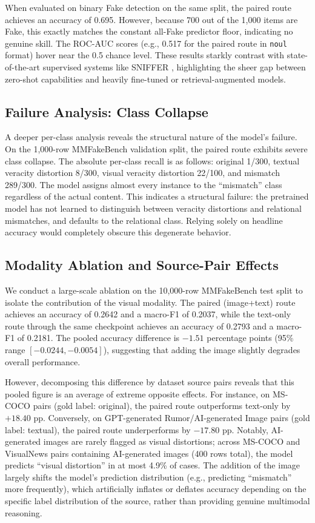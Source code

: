\documentclass{article} %
\begin{document}
When evaluated on binary Fake detection on the same split, the paired route achieves an accuracy of 0.695. However, because 700 out of the 1,000 items are Fake, this exactly matches the constant all-Fake predictor floor, indicating no genuine skill. The ROC-AUC scores (e.g., 0.517 for the paired route in \texttt{noul} format) hover near the 0.5 chance level. These results starkly contrast with state-of-the-art supervised systems like SNIFFER \citep{Qi2024SnifferMultimodal}, highlighting the sheer gap between zero-shot capabilities and heavily fine-tuned or retrieval-augmented models.

\subsection{Failure Analysis: Class Collapse}
A deeper per-class analysis reveals the structural nature of the model's failure. On the 1,000-row MMFakeBench validation split, the paired route exhibits severe class collapse. The absolute per-class recall is as follows: original 1/300, textual veracity distortion 8/300, visual veracity distortion 22/100, and mismatch 289/300. The model assigns almost every instance to the ``mismatch'' class regardless of the actual content. This indicates a structural failure: the pretrained model has not learned to distinguish between veracity distortions and relational mismatches, and defaults to the relational class. Relying solely on headline accuracy would completely obscure this degenerate behavior.

\subsection{Modality Ablation and Source-Pair Effects}
We conduct a large-scale ablation on the 10,000-row MMFakeBench test split to isolate the contribution of the visual modality. The paired (image+text) route achieves an accuracy of 0.2642 and a macro-F1 of 0.2037, while the text-only route through the same checkpoint achieves an accuracy of 0.2793 and a macro-F1 of 0.2181. The pooled accuracy difference is $-1.51$ percentage points (95\% range $[-0.0244, -0.0054]$), suggesting that adding the image slightly degrades overall performance.

However, decomposing this difference by dataset source pairs reveals that this pooled figure is an average of extreme opposite effects. For instance, on MS-COCO pairs (gold label: original), the paired route outperforms text-only by $+18.40$ pp. Conversely, on GPT-generated Rumor/AI-generated Image pairs (gold label: textual), the paired route underperforms by $-17.80$ pp. Notably, AI-generated images are rarely flagged as visual distortions; across MS-COCO and VisualNews pairs containing AI-generated images (400 rows total), the model predicts ``visual distortion'' in at most 4.9\% of cases. The addition of the image largely shifts the model's prediction distribution (e.g., predicting ``mismatch'' more frequently), which artificially inflates or deflates accuracy depending on the specific label distribution of the source, rather than providing genuine multimodal reasoning.
\end{document}
